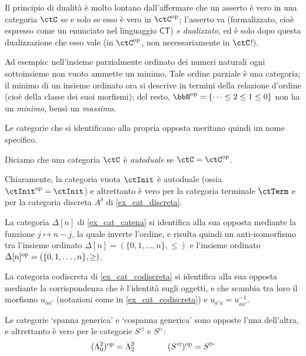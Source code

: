 \begin{remark}
	Il principio di dualità è molto lontano dall'affermare che un asserto è vero in una categoria \(\ctC\) se e solo se esso è vero in \(\ctC^\op\); l'asserto va (formalizzato, cioè espresso come un enunciato nel linguaggio \(\mathsf{CT}\)) \emph{e dualizzato}, ed è solo dopo questa dualizzazione che esso vale (in \(\ctC^\op\), non necessariamente in \(\ctC\)!).

	Ad esempio: nell'insieme parzialmente ordinato dei numeri naturali ogni sottoinsieme non vuoto ammette un minimo. Tale ordine parziale è una categoria; il minimo di un insieme ordinato ora si descrive in termini della relazione d'ordine (cioè della classe dei suoi morfismi); del resto, \(\bbN^\op = \{\dots\le 2 \le 1 \le 0\}\) non ha un \emph{minimo}, bensì un \emph{massimo}.
\end{remark}
Le categorie che si identificano alla propria opposta meritano quindi un nome specifico.
\begin{definition}
	Diciamo che una categoria \(\ctC\) è \emph{autoduale} se \(\ctC=\ctC^\op\).
\end{definition}
\begin{example}
	Chiaramente, la categoria vuota \(\ctInit\) è autoduale (ossia \(\ctInit^\op=\ctInit\)) e altrettanto è vero per la categoria terminale \(\ctTerm\) e per la categoria discreta \(A^\delta\) di \ref{ex_cat_discreta}.

	La categoria \(\Delta[n]\) di \ref{ex_cat_catena} si identifica alla sua opposta mediante la funzione \(j\mapsto n-j\), la quale inverte l'ordine, e risulta quindi un anti-isomorfismo tra l'insieme ordinato \(\Delta[n]=(\{0,1,\dots,n\},\le)\) e l'insieme ordinato \(\Delta[n]^{\text{op}} = (\{0,1,\dots,n\},\ge)\).

	La categoria codiscreta di \ref{ex_cat_codiscreta} si identifica alla sua opposta mediante la corrispondenza che è l'identità sugli oggetti, e che scambia tra loro il morfismo \(u_{aa'}\) (notazioni come in \ref{ex_cat_codiscreta}) e \(u_{a'a} = u_{aa'}^{-1}\).

	Le categorie `spanna generica' e `cospanna generica' sono opposte l'una dell'altra, e altrettanto è vero per le categorie \(S^\lhd\) e \(S^\rhd\):
	\[(\Lambda^2_0)^{\text{op}} = \Lambda^2_2\qquad\qquad (S^\lhd)^{\text{op}} = S^\rhd\]
\end{example}
